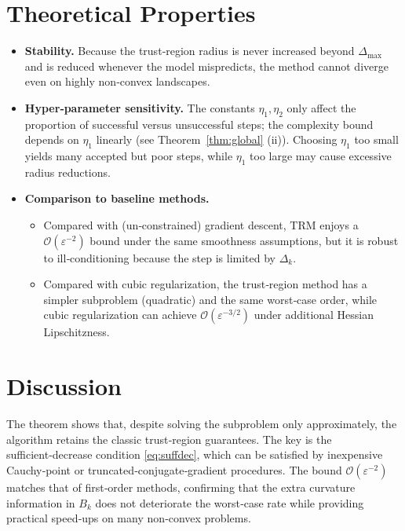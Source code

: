 \documentclass[11pt]{article}
\begin{document}
\section*{Theoretical Properties}
\begin{itemize}
\item \textbf{Stability.} Because the trust‑region radius is never increased beyond $\Delta_{\max}$ and is reduced whenever the model mispredicts, the method cannot diverge even on highly non‑convex landscapes.
\item \textbf{Hyper‑parameter sensitivity.} The constants $\eta_{1},\eta_{2}$ only affect the proportion of successful versus unsuccessful steps; the complexity bound depends on $\eta_{1}$ linearly (see Theorem~\ref{thm:global} (ii)). Choosing $\eta_{1}$ too small yields many accepted but poor steps, while $\eta_{1}$ too large may cause excessive radius reductions.
\item \textbf{Comparison to baseline methods.}
    \begin{itemize}
        \item Compared with (un‑constrained) gradient descent, TRM enjoys a \(\mathcal{O}(\varepsilon^{-2})\) bound under the same smoothness assumptions, but it is robust to ill‑conditioning because the step is limited by $\Delta_{k}$.
        \item Compared with cubic regularization, the trust‑region method has a simpler subproblem (quadratic) and the same worst‑case order, while cubic regularization can achieve $\mathcal{O}(\varepsilon^{-3/2})$ under additional Hessian Lipschitzness.
    \end{itemize}
\end{itemize}
\section*{Discussion}
The theorem shows that, despite solving the subproblem only approximately, the algorithm retains the classic trust‑region guarantees. The key is the sufficient‑decrease condition \eqref{eq:suffdec}, which can be satisfied by inexpensive Cauchy‑point or truncated‑conjugate‑gradient procedures. The bound $\mathcal{O}(\varepsilon^{-2})$ matches that of first‑order methods, confirming that the extra curvature information in $B_{k}$ does not deteriorate the worst‑case rate while providing practical speed‑ups on many non‑convex problems.

\end{document}
